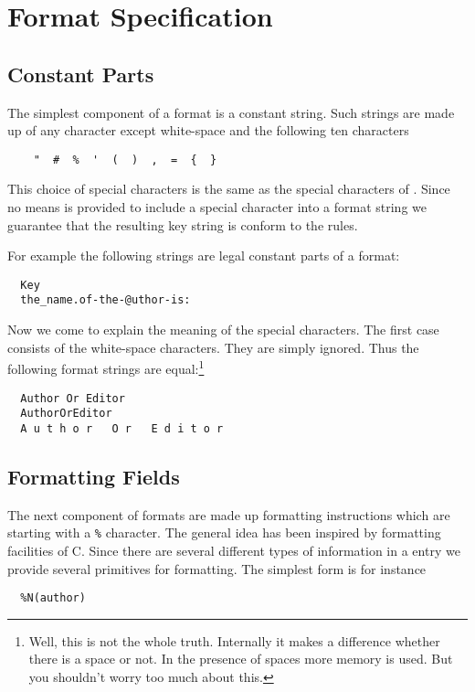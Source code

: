 \documentclass[11pt,a4paper]{scrbook}
\makeatletter
\let\BIBTEX\BibTeX
\renewcommand\BibTeX{\BIBTEX\index{bibtex@\BIBTEX}}
\makeatother
\begin{document}
\section{Format Specification}\label{sec:key.format}

\subsection{Constant Parts}

The simplest component of a format is a constant string. Such strings are
made up of any character except white-space and the following ten characters

\begin{verbatim}
    "  #  %  '  (  )  ,  =  {  }
\end{verbatim}

This choice of special characters is the same as the special characters of
\BibTeX. Since no means is provided to include a special character into a
format string we guarantee that the resulting key string is conform to the
\BibTeX{} rules.

For example the following strings are legal constant
parts of a format:
\begin{verbatim}
  Key
  the_name.of-the-@uthor-is:
\end{verbatim}


Now we come to explain the meaning of the special characters. The first case
consists of the white-space characters. They are simply ignored. Thus the
following format strings are equal:\footnote{Well, this is not the whole
truth. Internally it makes a difference whether there is a space or not. In
the presence of spaces more memory is used. But you shouldn't worry too much
about this.}
\begin{verbatim}
  Author Or Editor
  AuthorOrEditor
  A u t h o r   O r   E d i t o r
\end{verbatim}


\subsection{Formatting Fields}\label{ssec:fields}

The next component of formats are made up formatting instructions which are
starting with a \texttt{\%} character. The general idea has been inspired by
formatting facilities of C. Since there are several different types of
information in a \BibTeX{} entry we provide several primitives for formatting.
The simplest form is for instance
\begin{verbatim}
  %N(author)
\end{verbatim}
\end{document}
